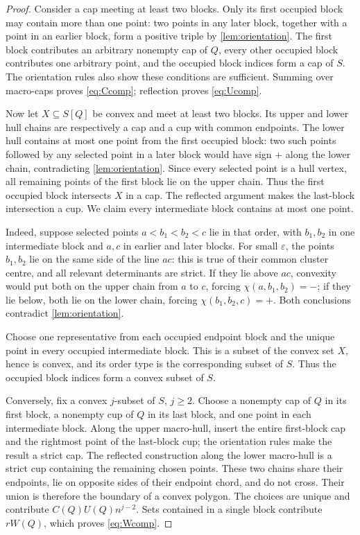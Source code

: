 \documentclass[11pt]{article}
\theoremstyle{remark}
\begin{document}
\begin{proof}
Consider a cap meeting at least two blocks.  Only its first occupied block
may contain more than one point: two points in any later block, together
with a point in an earlier block, form a positive triple by
\cref{lem:orientation}.  The first block contributes an arbitrary nonempty
cap of $Q$, every other occupied block contributes one arbitrary point, and
the occupied block indices form a cap of $S$.  The orientation rules also
show these conditions are sufficient.  Summing over macro-caps proves
\eqref{eq:Ccomp}; reflection proves \eqref{eq:Ucomp}.

Now let $X\subseteq S[Q]$ be convex and meet at least two blocks.  Its upper
and lower hull chains are respectively a cap and a cup with common
endpoints.  The lower hull contains at most one point from the first
occupied block: two such points followed by any selected point in a later
block would have sign $+$ along the lower chain, contradicting
\cref{lem:orientation}.  Since every selected point is a hull vertex, all
remaining points of the first block lie on the upper chain.  Thus the first
occupied block intersects $X$ in a cap.  The reflected argument makes the
last-block intersection a cup.  We claim every intermediate block contains
at most one point.

Indeed, suppose selected points $a<b_1<b_2<c$ lie in that order, with
$b_1,b_2$ in one intermediate block and $a,c$ in earlier and later blocks.
For small $\varepsilon$, the points $b_1,b_2$ lie on the same side of the
line $ac$: this is true of their common cluster centre, and all relevant
determinants are strict.  If they lie above $ac$, convexity would put both
on the upper chain from $a$ to $c$, forcing
$\chi(a,b_1,b_2)=-$; if they lie below, both lie on the lower chain,
forcing $\chi(b_1,b_2,c)=+$.  Both conclusions contradict
\cref{lem:orientation}.

Choose one representative from each occupied endpoint block and the unique
point in every occupied intermediate block.  This is a subset of the
convex set $X$, hence is convex, and its order type is the corresponding
subset of $S$.  Thus the occupied block indices form a convex subset of
$S$.

Conversely, fix a convex $j$-subset of $S$, $j\ge2$.  Choose a nonempty cap
of $Q$ in its first block, a nonempty cup of $Q$ in its last block, and one
point in each intermediate block.  Along the upper macro-hull, insert the
entire first-block cap and the rightmost point of the last-block cup; the
orientation rules make the result a strict cap.  The reflected construction
along the lower macro-hull is a strict cup containing the remaining chosen
points.  These two chains share their endpoints, lie on opposite sides of
their endpoint chord, and do not cross.  Their union is therefore the
boundary of a convex polygon.  The choices are unique and contribute
$C(Q)U(Q)n^{j-2}$.  Sets contained in a single block contribute $rW(Q)$,
which proves \eqref{eq:Wcomp}.
\end{proof}
\end{document}
